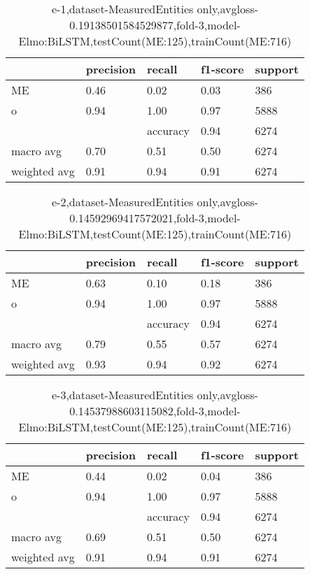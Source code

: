 \begin{table}[!ht] 
\centering
\caption{e-1,dataset-MeasuredEntities only,avgloss-0.19138501584529877,fold-3,model-Elmo:BiLSTM,testCount(ME:125),trainCount(ME:716)}\label{e-1data-meS.tsv}
\begin{tabularx}{300pt}{|X|X|X|X|X|}
\hline
&precision&recall&f1-score&support\\
\hline
ME&0.46&0.02&0.03&386\\
\hline
o&0.94&1.00&0.97&5888\\
\hline
&&accuracy&0.94&6274\\
\hline
macro avg&0.70&0.51&0.50&6274\\
\hline
weighted avg&0.91&0.94&0.91&6274\\
\hline
\end{tabularx}
\end{table}
\begin{table}[!ht] 
\centering
\caption{e-2,dataset-MeasuredEntities only,avgloss-0.14592969417572021,fold-3,model-Elmo:BiLSTM,testCount(ME:125),trainCount(ME:716)}\label{e-2data-meS.tsv}
\begin{tabularx}{300pt}{|X|X|X|X|X|}
\hline
&precision&recall&f1-score&support\\
\hline
ME&0.63&0.10&0.18&386\\
\hline
o&0.94&1.00&0.97&5888\\
\hline
&&accuracy&0.94&6274\\
\hline
macro avg&0.79&0.55&0.57&6274\\
\hline
weighted avg&0.93&0.94&0.92&6274\\
\hline
\end{tabularx}
\end{table}
\begin{table}[!ht] 
\centering
\caption{e-3,dataset-MeasuredEntities only,avgloss-0.14537988603115082,fold-3,model-Elmo:BiLSTM,testCount(ME:125),trainCount(ME:716)}\label{e-3data-meS.tsv}
\begin{tabularx}{300pt}{|X|X|X|X|X|}
\hline
&precision&recall&f1-score&support\\
\hline
ME&0.44&0.02&0.04&386\\
\hline
o&0.94&1.00&0.97&5888\\
\hline
&&accuracy&0.94&6274\\
\hline
macro avg&0.69&0.51&0.50&6274\\
\hline
weighted avg&0.91&0.94&0.91&6274\\
\hline
\end{tabularx}
\end{table}
